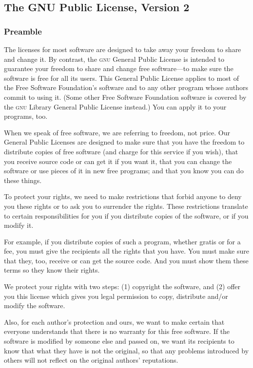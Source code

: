 \subsection{The GNU Public License, Version 2}

\subsubsection{Preamble}

The licenses for most software are designed to take away your freedom to
share and change it.  By contrast, the \textsc{gnu} General Public License is
intended to guarantee your freedom to share and change free software---to
make sure the software is free for all its users.  This General Public
License applies to most of the Free Software Foundation's software and to
any other program whose authors commit to using it.  (Some other Free
Software Foundation software is covered by the \textsc{gnu} Library
General Public License instead.)  You can apply it to your programs, too.

When we speak of free software, we are referring to freedom, not price.
Our General Public Licenses are designed to make sure that you have the
freedom to distribute copies of free software (and charge for this service
if you wish), that you receive source code or can get it if you want it,
that you can change the software or use pieces of it in new free programs;
and that you know you can do these things.

To protect your rights, we need to make restrictions that forbid anyone to
deny you these rights or to ask you to surrender the rights.  These
restrictions translate to certain responsibilities for you if you
distribute copies of the software, or if you modify it.

For example, if you distribute copies of such a program, whether gratis or
for a fee, you must give the recipients all the rights that you have.  You
must make sure that they, too, receive or can get the source code.  And
you must show them these terms so they know their rights.

We protect your rights with two steps: (1) copyright the software, and (2)
offer you this license which gives you legal permission to copy,
distribute and/or modify the software.

Also, for each author's protection and ours, we want to make certain that
everyone understands that there is no warranty for this free software.  If
the software is modified by someone else and passed on, we want its
recipients to know that what they have is not the original, so that any
problems introduced by others will not reflect on the original authors'
reputations.

